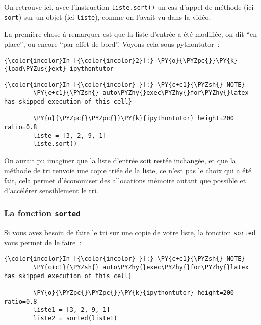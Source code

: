     On retrouve ici, avec l'instruction \texttt{liste.sort()} un cas d'appel
de méthode (ici \texttt{sort}) sur un objet (ici \texttt{liste}), comme
on l'avait vu dans la vidéo.

    La première chose à remarquer est que la liste d'entrée a été modifiée,
on dit ``en place'', ou encore ``par effet de bord''. Voyons cela sous
pythontutor~:

    \begin{Verbatim}[commandchars=\\\{\},frame=single,framerule=0.3mm,rulecolor=\color{cellframecolor}]
{\color{incolor}In [{\color{incolor}2}]:} \PY{o}{\PYZpc{}}\PY{k}{load\PYZus{}ext} ipythontutor
\end{Verbatim}


    \begin{Verbatim}[commandchars=\\\{\},frame=single,framerule=0.3mm,rulecolor=\color{cellframecolor}]
{\color{incolor}In [{\color{incolor} }]:} \PY{c+c1}{\PYZsh{} NOTE}
        \PY{c+c1}{\PYZsh{} auto\PYZhy{}exec\PYZhy{}for\PYZhy{}latex has skipped execution of this cell}
        
        \PY{o}{\PYZpc{}\PYZpc{}}\PY{k}{ipythontutor} height=200 ratio=0.8
        liste = [3, 2, 9, 1]
        liste.sort()
\end{Verbatim}


    On aurait pu imaginer que la liste d'entrée soit restée inchangée, et
que la méthode de tri renvoie une copie triée de la liste, ce n'est pas
le choix qui a été fait, cela permet d'économiser des allocations
mémoire autant que possible et d'accélérer sensiblement le tri.

    \hypertarget{la-fonction-sorted}{%
\subsubsection{\texorpdfstring{La fonction
\texttt{sorted}}{La fonction sorted}}\label{la-fonction-sorted}}

    Si vous avez besoin de faire le tri sur une copie de votre liste, la
fonction \texttt{sorted} vous permet de le faire~:

    \begin{Verbatim}[commandchars=\\\{\},frame=single,framerule=0.3mm,rulecolor=\color{cellframecolor}]
{\color{incolor}In [{\color{incolor} }]:} \PY{c+c1}{\PYZsh{} NOTE}
        \PY{c+c1}{\PYZsh{} auto\PYZhy{}exec\PYZhy{}for\PYZhy{}latex has skipped execution of this cell}
        
        \PY{o}{\PYZpc{}\PYZpc{}}\PY{k}{ipythontutor} height=200 ratio=0.8
        liste1 = [3, 2, 9, 1]
        liste2 = sorted(liste1)
\end{Verbatim}


